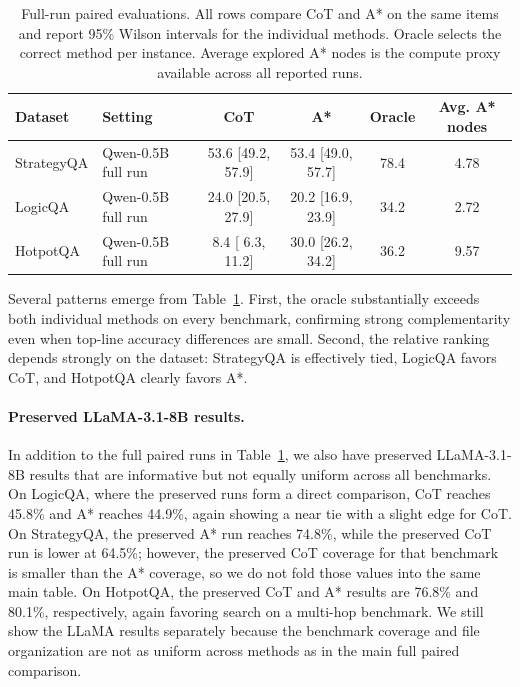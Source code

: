 \documentclass[11pt]{article}
\begin{document}
\begin{table}[t]
\centering

\small
\begin{tabular}{llcccc}
\toprule
\textbf{Dataset} & \textbf{Setting} & \textbf{CoT} & \textbf{A*} & \textbf{Oracle} & \textbf{Avg. A* nodes} \\
\midrule
StrategyQA & Qwen-0.5B full run & 53.6 [49.2, 57.9] & 53.4 [49.0, 57.7] & 78.4 & 4.78 \\
LogicQA    & Qwen-0.5B full run & 24.0 [20.5, 27.9] & 20.2 [16.9, 23.9] & 34.2 & 2.72 \\
HotpotQA   & Qwen-0.5B full run &  8.4 [ 6.3, 11.2] & 30.0 [26.2, 34.2] & 36.2 & 9.57 \\
\bottomrule
\end{tabular}
\caption{Full-run paired evaluations. All rows compare CoT and A* on the same items and report 95\% Wilson intervals for the individual methods. Oracle selects the correct method per instance. Average explored A* nodes is the compute proxy available across all reported runs.}
\label{tab:main}
\end{table}

Several patterns emerge from Table~\ref{tab:main}. First, the oracle substantially exceeds both individual methods on every benchmark, confirming strong complementarity even when top-line accuracy differences are small. Second, the relative ranking depends strongly on the dataset: StrategyQA is effectively tied, LogicQA favors CoT, and HotpotQA clearly favors A*.

\paragraph{Preserved LLaMA-3.1-8B results.} In addition to the full paired runs in Table~\ref{tab:main}, we also have preserved LLaMA-3.1-8B results that are informative but not equally uniform across all benchmarks. On LogicQA, where the preserved runs form a direct comparison, CoT reaches 45.8\% and A* reaches 44.9\%, again showing a near tie with a slight edge for CoT. On StrategyQA, the preserved A* run reaches 74.8\%, while the preserved CoT run is lower at 64.5\%; however, the preserved CoT coverage for that benchmark is smaller than the A* coverage, so we do not fold those values into the same main table. On HotpotQA, the preserved CoT and A* results are 76.8\% and 80.1\%, respectively, again favoring search on a multi-hop benchmark. We still show the LLaMA results separately because the benchmark coverage and file organization are not as uniform across methods as in the main full paired comparison.
\end{document}
